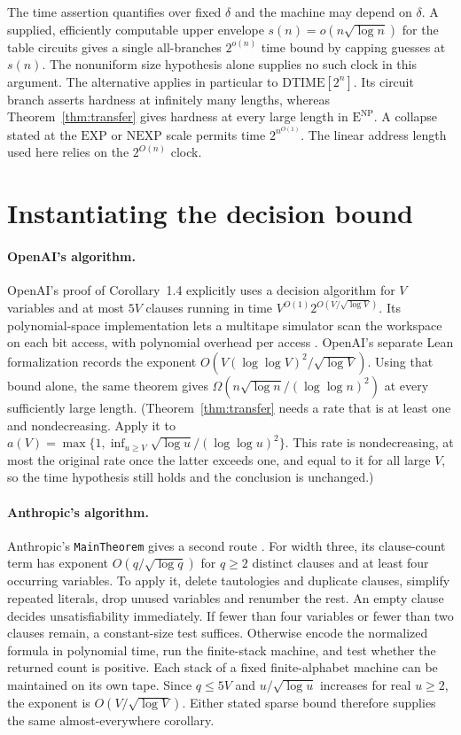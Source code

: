\documentclass[12pt,letterpaper]{article}
\begin{document}
The time assertion quantifies over fixed $\delta$ and the machine may
depend on $\delta$. A supplied, efficiently computable upper envelope
$s(n)=o(n\sqrt{\log n})$ for the table circuits gives a single
all-branches $2^{o(n)}$ time bound by capping guesses at $s(n)$.
The nonuniform size hypothesis alone supplies no such clock in this
argument. The alternative applies in particular to
$\mathrm{DTIME}[2^n]$. Its circuit branch asserts hardness at
infinitely many lengths, whereas Theorem~\ref{thm:transfer} gives
hardness at every large length in $\mathrm E^{\mathrm{NP}}$. A
collapse stated at the $\mathrm{EXP}$ or $\mathrm{NEXP}$ scale permits
time $2^{n^{O(1)}}$. The linear address length used here relies on
the $2^{O(n)}$ clock.

\section{Instantiating the decision bound}\label{sec:instantiate}

\paragraph{OpenAI's algorithm.}
OpenAI's proof of Corollary~1.4 explicitly uses a decision algorithm for
\(V\) variables and at most \(5V\) clauses running in time
\(V^{O(1)}2^{O(V/\sqrt{\log V})}\). Its polynomial-space implementation lets
a multitape simulator scan the workspace on each bit access, with
polynomial overhead per access \cite{oai}. OpenAI's separate Lean
formalization records the exponent \(O(V(\log\log V)^2/\sqrt{\log V})\).
Using that bound alone, the same theorem gives
\(\Omega(n\sqrt{\log n}/(\log\log n)^2)\) at every sufficiently large
length. (Theorem~\ref{thm:transfer} needs a rate that is at least one and
nondecreasing. Apply it to
\(a(V)=\max\{1,\inf_{u\ge V}\sqrt{\log u}/(\log\log u)^2\}\). This rate
is nondecreasing, at most the original rate once the latter exceeds one, and
equal to it for all large \(V\), so the time hypothesis still holds and the
conclusion is unchanged.)

\paragraph{Anthropic's algorithm.}
Anthropic's \texttt{MainTheorem} gives a second route \cite{anthropic}. For
width three, its clause-count term has exponent \(O(q/\sqrt{\log q})\) for
\(q\ge2\) distinct clauses and at least four occurring variables. To apply
it, delete tautologies and duplicate clauses, simplify repeated literals,
drop unused variables and renumber the rest. An empty clause decides
unsatisfiability immediately. If fewer than four variables or fewer than
two clauses remain, a constant-size test suffices. Otherwise encode the
normalized formula in polynomial time, run the finite-stack machine, and
test whether the returned count is positive. Each stack of a fixed
finite-alphabet machine can be maintained on its own tape. Since
\(q\le5V\) and \(u/\sqrt{\log u}\) increases for real \(u\ge2\), the
exponent is \(O(V/\sqrt{\log V})\). Either stated sparse bound therefore
supplies the same almost-everywhere corollary.
\end{document}

